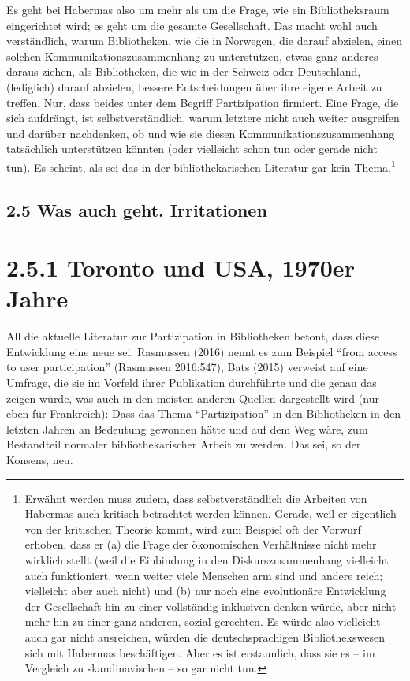 \documentclass[a4paper,
fontsize=11pt,
oneside,
numbers=noperiodatend,
parskip=half-,
bibliography=totoc,
final
]{scrartcl}
\begin{document}
Es geht bei Habermas also um mehr als um die Frage, wie ein
Bibliotheksraum eingerichtet wird; es geht um die gesamte Gesellschaft.
Das macht wohl auch verständlich, warum Bibliotheken, wie die in
Norwegen, die darauf abzielen, einen solchen Kommunikationszusammenhang
zu unterstützen, etwas ganz anderes daraus ziehen, als Bibliotheken, die
wie in der Schweiz oder Deutschland, (lediglich) darauf abzielen,
bessere Entscheidungen über ihre eigene Arbeit zu treffen. Nur, dass
beides unter dem Begriff Partizipation firmiert. Eine Frage, die sich
aufdrängt, ist selbstverständlich, warum letztere nicht auch weiter
ausgreifen und darüber nachdenken, ob und wie sie diesen
Kommunikationszusammenhang tatsächlich unterstützen könnten (oder
vielleicht schon tun oder gerade nicht tun). Es scheint, als sei das in
der bibliothekarischen Literatur gar kein Thema.\footnote{Erwähnt werden
  muss zudem, dass selbstverständlich die Arbeiten von Habermas auch
  kritisch betrachtet werden können. Gerade, weil er eigentlich von der
  kritischen Theorie kommt, wird zum Beispiel oft der Vorwurf erhoben,
  dass er (a) die Frage der ökonomischen Verhältnisse nicht mehr
  wirklich stellt (weil die Einbindung in den Diskurszusammenhang
  vielleicht auch funktioniert, wenn weiter viele Menschen arm sind und
  andere reich; vielleicht aber auch nicht) und (b) nur noch eine
  evolutionäre Entwicklung der Gesellschaft hin zu einer vollständig
  inklusiven denken würde, aber nicht mehr hin zu einer ganz anderen,
  sozial gerechten. Es würde also vielleicht auch gar nicht ausreichen,
  würden die deutschsprachigen Bibliothekswesen sich mit Habermas
  beschäftigen. Aber es ist erstaunlich, dass sie es -- im Vergleich zu
  skandinavischen -- so gar nicht tun.}

\subsection{2.5 Was auch geht.
Irritationen}\label{was-auch-geht.-irritationen}

\section*{2.5.1 Toronto und USA, 1970er
Jahre}\label{toronto-und-usa-1970er-jahre}

All die aktuelle Literatur zur Partizipation in Bibliotheken betont,
dass diese Entwicklung eine neue sei. Rasmussen (2016) nennt es zum
Beispiel \enquote{from access to user participation} (Rasmussen
2016:547), Bats (2015) verweist auf eine Umfrage, die sie im Vorfeld
ihrer Publikation durchführte und die genau das zeigen würde, was auch
in den meisten anderen Quellen dargestellt wird (nur eben für
Frankreich): Dass das Thema \enquote{Partizipation} in den Bibliotheken
in den letzten Jahren an Bedeutung gewonnen hätte und auf dem Weg wäre,
zum Bestandteil normaler bibliothekarischer Arbeit zu werden. Das sei,
so der Konsens, neu.
\end{document}
